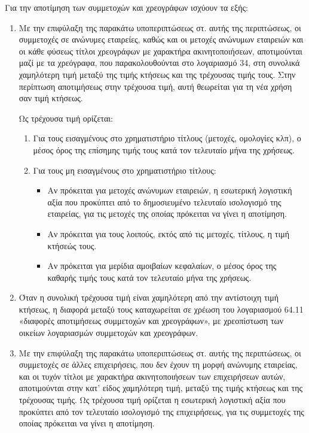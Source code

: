 \documentclass[A4,10pt,greek]{book}
\begin{document}
Για την αποτίμηση των συμμετοχών και χρεογράφων ισχύουν τα εξής:

\begin{enumerate}

\item Με την επιφύλαξη της παρακάτω υποπεριπτώσεως στ. αυτής της περιπτώσεως, οι συμμετοχές σε ανώνυμες εταιρείες, καθώς και οι μετοχές ανώνυμων εταιρειών και οι κάθε φύσεως τίτλοι χρεογράφων με χαρακτήρα ακινητοποιήσεων, αποτιμούνται μαζί με τα χρεόγραφα, που παρακολουθούνται στο λογαριασμό 34, στη συνολικά χαμηλότερη τιμή μεταξύ της τιμής κτήσεως και της τρέχουσας τιμής τους. Στην περίπτωση αποτιμήσεως στην τρέχουσα τιμή, αυτή θεωρείται για τη νέα χρήση σαν τιμή κτήσεως.

Ως τρέχουσα τιμή ορίζεται:

\begin{enumerate}

\item Για τους εισαγμένους στο χρηματιστήριο τίτλους (μετοχές, ομολογίες κλπ), ο μέσος όρος της επίσημης τιμής τους κατά τον τελευταίο μήνα της χρήσεως.

\item Για τους μη εισαγμένους στο χρηματιστήριο τίτλους:

\begin{itemize}
\item Αν πρόκειται για μετοχές ανώνυμων εταιρειών, η εσωτερική λογιστική αξία που προκύπτει από το δημοσιευμένο τελευταίο ισολογισμό της εταιρείας, για τις μετοχές της οποίας πρόκειται να γίνει η αποτίμηση.

\item Αν πρόκειται για τους λοιπούς, εκτός από τις μετοχές, τίτλους, η τιμή κτήσεώς τους.

\item Αν πρόκειται για μερίδια αμοιβαίων κεφαλαίων, ο μέσος όρος της καθαρής τιμής τους κατά τον τελευταίο μήνα της χρήσεως.

\end{itemize}

\end{enumerate}
\item Όταν η συνολική τρέχουσα τιμή είναι χαμηλότερη από την αντίστοιχη τιμή κτήσεως, η διαφορά μεταξύ τους καταχωρείται σε χρέωση του λογαριασμού 64.11 «διαφορές αποτιμήσεως συμμετοχών και χρεογράφων», με χρεοπίστωση των οικείων λογαριασμών συμμετοχών και χρεογράφων.

\item Με την επιφύλαξη της παρακάτω υποπεριπτώσεως στ. αυτής της περιπτώσεως, οι συμμετοχές σε άλλες επιχειρήσεις, που δεν έχουν τη μορφή ανώνυμης εταιρείας, και οι τυχόν τίτλοι με χαρακτήρα ακινητοποιήσεων των επιχειρήσεων αυτών, αποτιμούνται στην κατ' είδος χαμηλότερη τιμή, μεταξύ της τιμής κτήσεως και της τρέχουσας τιμής. Ως τρέχουσα τιμή ορίζεται η εσωτερική λογιστική αξία που προκύπτει από τον τελευταίο ισολογισμό της επιχειρήσεως, για τις συμμετοχές της οποίας πρόκειται να γίνει η αποτίμηση.


\end{enumerate}
\end{document}
